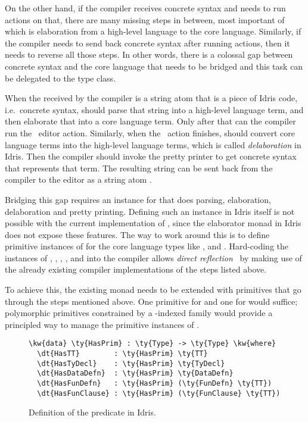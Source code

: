 On the other hand, if the compiler receives concrete syntax and needs to run \Elab{}
actions on that, there are many missing steps in between, most important of
which is elaboration from a high-level language to the core language.
Similarly, if the compiler needs to send back concrete syntax after
running \Elab{} actions, then it needs to reverse all those steps.
In other words, there is a colossal gap between concrete syntax and the core
language that needs to be bridged and this task can be delegated to the
\Editorable{} type class.

When the \sexp{} received by the compiler is a string atom that is a
piece of Idris code, i.e.\ concrete syntax,  should parse that
string into a high-level language term, and then elaborate that into a core
language term. Only after that can the compiler run the \Elab\ editor action.
Similarly, when the \Elab\ action finishes,  should convert core
language terms into the high-level language terms, which is called
\emph{delaboration} in Idris. Then the compiler should invoke the pretty
printer to get concrete syntax that represents that term. The resulting string
can be sent back from the compiler to the editor as a string atom \sexp{}.

Bridging this gap requires an \Editorable{} instance for \TT{} that does parsing,
elaboration, delaboration and pretty printing. Defining such an instance in
Idris itself is not possible with the current implementation of \Elab{}, since
the elaborator monad in Idris does not expose these features.
The way to work around this is to define primitive instances of \Editorable{}
for the core language types like \TT{}, \TyDecl{} and \FunDefn{}.
Hard-coding the \Editorable{} instances of , ,
, , and  into the compiler
allows \emph{direct reflection}~\cite{barzilayphd} by making use
of the already existing compiler implementations of the steps listed above.

To achieve this, the existing \Elab{} monad needs to be extended with
primitives that go through the steps mentioned above.  One \Elab{} primitive
for  and one for  would suffice; polymorphic
primitives constrained by a -indexed family would provide a principled
way to manage the primitive instances of \Editorable{}.

\begin{figure}[H]
\begin{Verbatim}
\kw{data} \ty{HasPrim} : \ty{Type} -> \ty{Type} \kw{where}
  \dt{HasTT}        : \ty{HasPrim} \ty{TT}
  \dt{HasTyDecl}    : \ty{HasPrim} \ty{TyDecl}
  \dt{HasDataDefn}  : \ty{HasPrim} \ty{DataDefn}
  \dt{HasFunDefn}   : \ty{HasPrim} (\ty{FunDefn} \ty{TT})
  \dt{HasFunClause} : \ty{HasPrim} (\ty{FunClause} \ty{TT})
\end{Verbatim}
\caption{Definition of the  predicate in Idris.}
\end{figure}

